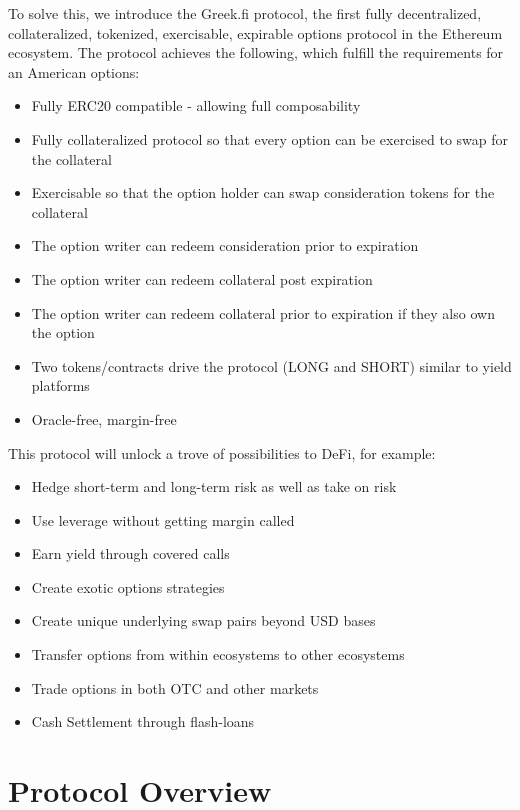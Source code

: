 \documentclass[%
 reprint,
 amsmath,amssymb,
 aps,
]{revtex4-2}
\newcommand{\greekfi}{Greek.fi }
\begin{document}
To solve this, we introduce the \greekfi protocol, the first fully decentralized, collateralized, tokenized, exercisable, expirable options protocol in the Ethereum ecosystem.
The protocol achieves the following, which fulfill the requirements for an American options:
\begin{itemize}
  \setlength{\itemsep}{0pt}
  \setlength{\parskip}{0pt}
  \item Fully ERC20 compatible - allowing full composability
  \item Fully collateralized protocol so that every option can be exercised to swap for the collateral
  \item Exercisable so that the option holder can swap consideration tokens for the collateral
  \item The option writer can redeem consideration prior to expiration
  \item The option writer can redeem collateral post expiration
  \item The option writer can redeem collateral prior to expiration if they also own the option
  \item Two tokens/contracts drive the protocol (LONG and SHORT) similar to yield platforms
  \item Oracle-free, margin-free
\end{itemize}

This protocol will unlock a trove of possibilities to DeFi, for example:

\begin{itemize}
  \setlength{\itemsep}{0pt}
  \setlength{\parskip}{0pt}
  \item Hedge short-term and long-term risk as well as take on risk
  \item Use leverage without getting margin called
  \item Earn yield through covered calls
  \item Create exotic options strategies
  \item Create unique underlying swap pairs beyond USD bases
  \item Transfer options from within ecosystems to other ecosystems
  \item Trade options in both OTC and other markets
  \item Cash Settlement through flash-loans
\end{itemize}

\section{Protocol Overview}
\end{document}

